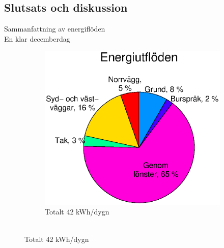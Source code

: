 \subsection{Slutsats och diskussion}

\begin{frame}{Sammanfattning av energiflöden\\En klar decemberdag}


\begin{figure}
        \begin{subfigure}[b]{0.54\textwidth}
                \centering
                \includegraphics[width=\textwidth]{images/totalflow_out.eps}
                \caption*{Totalt 42 kWh/dygn \\ ~}
        \end{subfigure}
        \hskip-1.3cm
\end{figure}
\end{frame}
